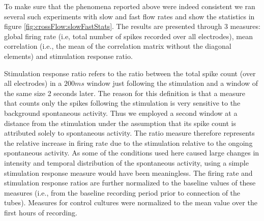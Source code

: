         To make sure that the phenomena reported above were indeed consistent we ran several such experiments with slow and fast flow rates and show the statistics in figure \ref{fig:crossFlow:slowFastStats}. The results are presented through 3 measures: global firing rate (i.e, total number of spikes recorded over all electrodes), mean correlation (i.e., the mean of the correlation matrix without the diagonal elements) and stimulation response ratio.

        Stimulation response ratio refers to the ratio between the total spike count (over all electrodes) in a \(200 ms\) window just following the stimulation and a window of the same size 2 seconds later. The reason for this definition is that a measure that counts only the spikes following the stimulation is very sensitive to the background spontaneous activity. Thus we employed a second window at a distance from the stimulation under the assumption that its spike count is attributed solely to spontaneous activity. The ratio measure therefore represents the relative increase in  firing rate due to the stimulation relative to the ongoing spontaneous activity. As some of the conditions used here caused large changes in intensity and temporal distribution of the spontaneous activity, using a simple stimulation response measure would have been meaningless. The firing rate and stimulation response ratios are further normalized to the baseline values of these measures (i.e., from the baseline recording period prior to connection of the tubes). Measures for control cultures were normalized to the mean value over the first hours of recording.


